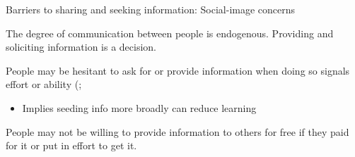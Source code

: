 \documentclass[aspectratio=169, 10pt, handout]{beamer}
\newenvironment{wideitemize}{\itemize\addtolength{\itemsep}{10pt}}{\enditemize}
\begin{document}
\begin{frame}{Barriers to sharing and seeking information: Social-image concerns}

\begin{wideitemize}

	\item The degree of communication between people is endogenous. Providing and soliciting information is a decision.

	\item People may be hesitant to ask for or provide information when doing so signals effort or ability (\cite{Chandrasekhar2018,banerjee2018}; 
	
	\begin{itemize}
	
		\item Implies seeding info more broadly can reduce learning
	
	\end{itemize}
	
	\item People may not be willing to provide information to others for free if they paid for it or put in effort to get it.

	
\end{wideitemize}

\end{frame}
\end{document}
